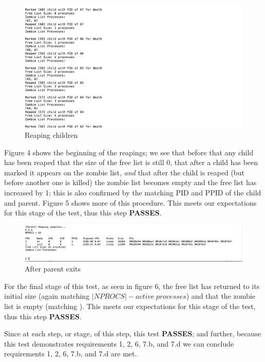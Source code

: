 \documentclass[11pt,letterpaper]{report}
\begin{document}
\pagebreak

\begin{figure}[h]
\centering
\includegraphics[width=0.8\linewidth]{zombie-during.png}
\caption{Reaping children}
\label{fig:4}
\end{figure}


Figure 4 shows the beginning of the reapings; we see that before that any child has been reaped that the size of the free list is still 0, that after a child has been marked it appears on the zombie list, \emph{and} that after the child is reaped (but before another one is killed) the zombie list becomes empty and the free list has increased by 1; this is also confirmed by the matching PID and PPID of the child and parent. Figure 5 shows more of this procedure. This meets our expectations for this stage of the test, thus this step \textbf{PASSES}.

\pagebreak


\begin{figure}[h]
\centering
\includegraphics[width=0.8\linewidth]{zombie-after.png}
\caption{After parent exits}
\label{fig:5}
\end{figure}

For the final stage of this test, as seen in figure 6, the free list has returned to its initial size (again matching $|NPROCS| - active\  processes$) and that the zombie list is empty (matching ). This meets our expectations for this stage of the test, thus this step \textbf{PASSES}.


Since at each step, or stage, of this step, this test \textbf{PASSES}; and further, because this test demonstrates requirements 1, 2, 6, 7.b, and 7.d we can conclude requirements 
1, 2, 6, 7.b, and 7.d are met.
\end{document}
